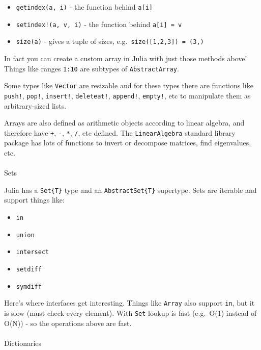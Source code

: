 \documentclass[
]{article}
\makeatletter
\let\oldparagraph\paragraph
\renewcommand{\paragraph}{
    \@ifstar
      \xxxParagraphStar
      \xxxParagraphNoStar
  }
\newcommand{\xxxParagraphStar}[1]{\oldparagraph*{#1}\mbox{}}
\newcommand{\xxxParagraphNoStar}[1]{\oldparagraph{#1}\mbox{}}
\providecommand{\tightlist}{%
  \setlength{\itemsep}{0pt}\setlength{\parskip}{0pt}}
\makeatother
\begin{document}
\begin{itemize}
\tightlist
\item
  \texttt{getindex(a,\ i)} - the function behind \texttt{a{[}i{]}}
\item
  \texttt{setindex!(a,\ v,\ i)} - the function behind
  \texttt{a{[}i{]}\ =\ v}
\item
  \texttt{size(a)} - gives a tuple of sizes,
  e.g.~\texttt{size({[}1,2,3{]})\ =\ (3,)}
\end{itemize}

In fact you can create a custom array in Julia with just those methods
above! Things like ranges \texttt{1:10} are subtypes of
\texttt{AbstractArray}.

Some types like \texttt{Vector} are resizable and for these types there
are functions like \texttt{push!}, \texttt{pop!}, \texttt{insert!},
\texttt{deleteat!}, \texttt{append!}, \texttt{empty!}, etc to manipulate
them as arbitrary-sized lists.

Arrays are also defined as arithmetic objects according to linear
algebra, and therefore have \texttt{+}, \texttt{-}, \texttt{*},
\texttt{/}, etc defined. The \texttt{LinearAlgebra} standard library
package has lots of functions to invert or decompose matrices, find
eigenvalues, etc.

\paragraph{Sets}\label{sets}

Julia has a \texttt{Set\{T\}} type and an \texttt{AbstractSet\{T\}}
supertype. Sets are iterable and support things like:

\begin{itemize}
\tightlist
\item
  \texttt{in}
\item
  \texttt{union}
\item
  \texttt{intersect}
\item
  \texttt{setdiff}
\item
  \texttt{symdiff}
\end{itemize}

Here's where interfaces get interesting. Things like \texttt{Array} also
support \texttt{in}, but it is slow (must check every element). With
\texttt{Set} lookup is fast (e.g.~O(1) instead of O(N)) - so the
operations above are fast.

\paragraph{Dictionaries}\label{dictionaries}
\end{document}
